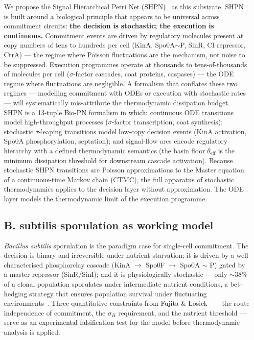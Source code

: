 \documentclass[11pt,a4paper]{article}
\newcommand{\thetaeff}{\theta_{\mathrm{eff}}}
\begin{document}
We propose the Signal Hierarchical Petri Net (SHPN)~\cite{Simao2025} as
this substrate.
SHPN is built around a biological principle that appears to be universal
across commitment circuits: \textbf{the decision is stochastic; the
execution is continuous.}
Commitment events are driven by regulatory molecules present at copy numbers
of tens to hundreds per cell (KinA, Spo0A$\sim$P, SinR, CI repressor,
CtrA) --- the regime where Poisson fluctuations are the mechanism, not
noise to be suppressed.
Execution programmes operate at thousands to tens-of-thousands of molecules
per cell ($\sigma$-factor cascades, coat proteins, caspases) --- the
ODE regime where fluctuations are negligible.
A formalism that conflates these two regimes --- modelling commitment with
ODEs or execution with stochastic rates --- will systematically
mis-attribute the thermodynamic dissipation budget.
SHPN is a 13-tuple Bio-PN formalism in which:
continuous ODE transitions model high-throughput processes ($\sigma$-factor
transcription, coat synthesis);
stochastic $\tau$-leaping transitions model low-copy decision events
(KinA activation, Spo0A phosphorylation, septation);
and signal-flow arcs encode regulatory hierarchy with a defined
thermodynamic semantics (the basin floor $\thetaeff$ is the minimum
dissipation threshold for downstream cascade activation).
Because stochastic SHPN transitions are Poisson approximations to the
Master equation of a continuous-time Markov chain (CTMC), the full
apparatus of stochastic thermodynamics applies to the decision layer
without approximation.
The ODE layer models the thermodynamic limit of the execution programme.

\subsection*{B. subtilis sporulation as working model}

\textit{Bacillus subtilis} sporulation is the paradigm case for
single-cell commitment.
The decision is binary and irreversible under nutrient starvation;
it is driven by a well-characterised phosphorelay cascade
(KinA $\to$ Spo0F $\to$ Spo0A $\sim$ P) gated by a master repressor
(SinR/SinI);
and it is physiologically stochastic --- only $\sim$38\% of a clonal
population sporulates under intermediate nutrient conditions, a
bet-hedging strategy that ensures population survival under fluctuating
environments~\cite{Fujita2005,Losick2008}.
Three quantitative constraints from Fujita \& Losick~\cite{Fujita2005}
--- the route independence of commitment, the $\sigma_H$ requirement, and
the nutrient threshold --- serve as an experimental falsification test
for the model before thermodynamic analysis is applied.
\end{document}
